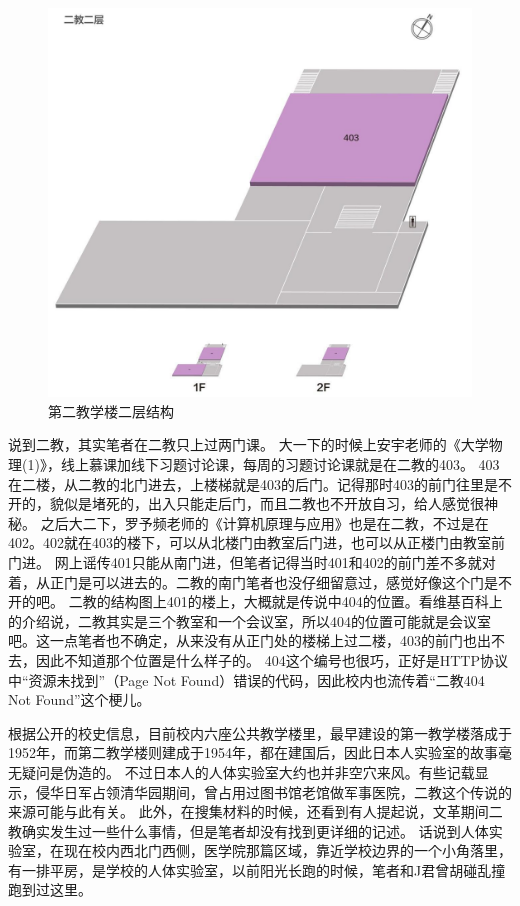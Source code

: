 \begin{figure}[!t]
	\centering
	\includegraphics[width=\linewidth]{figures/二教二层.jpg}
	第二教学楼二层结构
\end{figure}

说到二教，其实笔者在二教只上过两门课。
大一下的时候上安宇老师的《大学物理(1)》，线上慕课加线下习题讨论课，每周的习题讨论课就是在二教的403。
403在二楼，从二教的北门进去，上楼梯就是403的后门。记得那时403的前门往里是不开的，貌似是堵死的，出入只能走后门，而且二教也不开放自习，给人感觉很神秘。
之后大二下，罗予频老师的《计算机原理与应用》也是在二教，不过是在402。402就在403的楼下，可以从北楼门由教室后门进，也可以从正楼门由教室前门进。
网上谣传401只能从南门进，但笔者记得当时401和402的前门差不多就对着，从正门是可以进去的。二教的南门笔者也没仔细留意过，感觉好像这个门是不开的吧。
二教的结构图上401的楼上，大概就是传说中404的位置。看维基百科上的介绍说，二教其实是三个教室和一个会议室，所以404的位置可能就是会议室吧。这一点笔者也不确定，从来没有从正门处的楼梯上过二楼，403的前门也出不去，因此不知道那个位置是什么样子的。
404这个编号也很巧，正好是HTTP协议中“资源未找到”（Page Not Found）错误的代码，因此校内也流传着“二教404 Not Found”这个梗儿。

根据公开的校史信息，目前校内六座公共教学楼里，最早建设的第一教学楼落成于1952年，而第二教学楼则建成于1954年，都在建国后，因此日本人实验室的故事毫无疑问是伪造的。
不过日本人的人体实验室大约也并非空穴来风。有些记载显示，侵华日军占领清华园期间，曾占用过图书馆老馆做军事医院，二教这个传说的来源可能与此有关。
此外，在搜集材料的时候，还看到有人提起说，文革期间二教确实发生过一些什么事情，但是笔者却没有找到更详细的记述。
话说到人体实验室，在现在校内西北门西侧，医学院那篇区域，靠近学校边界的一个小角落里，有一排平房，是学校的人体实验室，以前阳光长跑的时候，笔者和J君曾胡碰乱撞跑到过这里。

